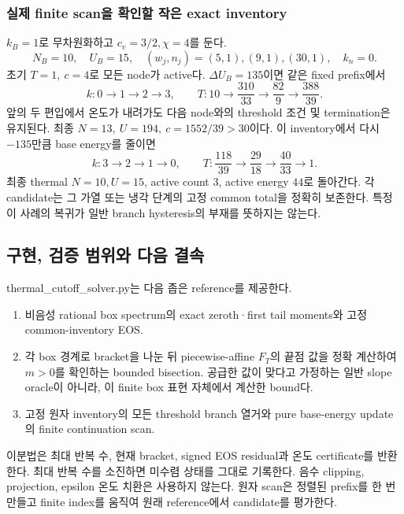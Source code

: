 \hypertarget{uxc2e4uxc81c-finite-scanuxc744-uxd655uxc778uxd560-uxc791uxc740-exact-inventory}{%
\subsubsection{실제 finite scan을 확인할 작은 exact inventory}\label{uxc2e4uxc81c-finite-scanuxc744-uxd655uxc778uxd560-uxc791uxc740-exact-inventory}}

\(k_B=1\)로 무차원화하고 \(c_v=3/2,\chi=4\)를 둔다. \[
N_B=10,\quad U_B=15,\quad
(w_j,n_j)=(5,1),(9,1),(30,1),\quad k_n=0 .
\tag{TCF.44}
\] 초기 \(T=1,\ c=4\)로 모든 node가 active다. \(\Delta U_B=135\)이면 같은 fixed prefix에서 \[
k:0\to1\to2\to3,\qquad
T:10\to\frac{310}{33}\to\frac{82}{9}\to\frac{388}{39}.
\tag{TCF.45}
\] 앞의 두 편입에서 온도가 내려가도 다음 node와의 threshold 조건 및 termination은 유지된다. 최종 \(N=13,\ U=194,\ c=1552/39>30\)이다. 이 inventory에서 다시 \(-135\)만큼 base energy를 줄이면 \[
k:3\to2\to1\to0,\qquad
T:\frac{118}{39}\to\frac{29}{18}\to\frac{40}{33}\to1 .
\tag{TCF.46}
\] 최종 thermal \(N=10,U=15\), active count \(3\), active energy \(44\)로 돌아간다. 각 candidate는 그 가열 또는 냉각 단계의 고정 common total을 정확히 보존한다. 특정 이 사례의 복귀가 일반 branch hysteresis의 부재를 뜻하지는 않는다.

\hypertarget{uxad6cuxd604-uxac80uxc99d-uxbc94uxc704uxc640-uxb2e4uxc74c-uxacb0uxc18d}{%
\subsection{구현, 검증 범위와 다음 결속}\label{uxad6cuxd604-uxac80uxc99d-uxbc94uxc704uxc640-uxb2e4uxc74c-uxacb0uxc18d}}

thermal\_cutoff\_solver.py는 다음 좁은 reference를 제공한다.

\begin{enumerate}
\def\labelenumi{\arabic{enumi}.}
\tightlist
\item
  비음성 rational box spectrum의 exact zeroth·first tail moments와 고정 common-inventory EOS.
\item
  각 box 경계로 bracket을 나눈 뒤 piecewise-affine \(F_T\)의 끝점 값을 정확 계산하여 \(m>0\)를 확인하는 bounded bisection. 공급한 값이 맞다고 가정하는 일반 slope oracle이 아니라, 이 finite box 표현 자체에서 계산한 bound다.
\item
  고정 원자 inventory의 모든 threshold branch 열거와 pure base-energy update의 finite continuation scan.
\end{enumerate}

이분법은 최대 반복 수, 현재 bracket, signed EOS residual과 온도 certificate를 반환한다. 최대 반복 수를 소진하면 미수렴 상태를 그대로 기록한다. 음수 clipping, projection, epsilon 온도 치환은 사용하지 않는다. 원자 scan은 정렬된 prefix를 한 번 만들고 finite index를 움직여 원래 reference에서 candidate를 평가한다.

